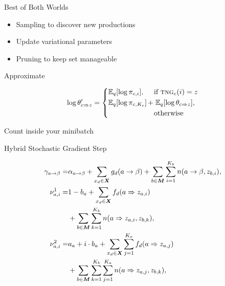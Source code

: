 \begin{frame}{Best of Both Worlds}

\begin{itemize}
  \item Sampling to discover new productions
  \item Update variational parameters
  \item Pruning to keep set manageable
\end{itemize}

\end{frame}

\begin{frame}{Approximate }

\begin{align}
   \log \theta'_{c \Rightarrow z} =
  \begin{dcases}
     \mathbb{E}_q [ \log \pi_{c, i} ], & \mbox{if $\tng{c}(i) = z$}  \\
     \mathbb{E}_q [ \log \pi_{c, K_c} ] & \hspace{-.3cm} + \hspace{.1cm} \mathbb{E}_q [ \log \theta_{c \Rightarrow z} ], \\
    & \mbox{otherwise}
  \end{dcases}
  \label{eq:approx-pcfg}
\end{align}


\end{frame}

\begin{frame}{Count inside your minibatch}


\end{frame}

\begin{frame}{Hybrid Stochastic Gradient Step}

\begin{align}
   \gamma_{a \rightarrow \beta} = &  \alpha_{a \rightarrow\beta}
  + \sum_{x_d \in \boldsymbol{X}} g_d(a \rightarrow \beta) \notag + \sum_{b \in \boldsymbol{M}} \sum_{i=1}^{K_b} n(a
  \rightarrow \beta, z_{b, i}), \notag \\
   \nu^1_{a, i} = &  1- b_a + \sum_{x_d \in
    \boldsymbol{X}} f_{d}(a \Rightarrow z_{a,i}) \notag \\
  &  + \sum_{b \in \boldsymbol{M}} \sum_{k=1}^{K_b} n(a
  \Rightarrow z_{a, i}, z_{b, k}), \notag \\
   \nu^2_{a, i} = &  a_a + i \cdot b_a +
  \sum_{x_d \in \boldsymbol{X}} \sum_{j=1}^{K_a} f_{d}(a \Rightarrow
  z_{a, j}) \notag \\
  &  + \sum_{b \in \boldsymbol{M}} \sum_{k=1}^{K_b}
  \sum_{j=1}^{K_a} n(a \Rightarrow z_{a, j}, z_{b, k}), \notag
\end{align}


\end{frame}


